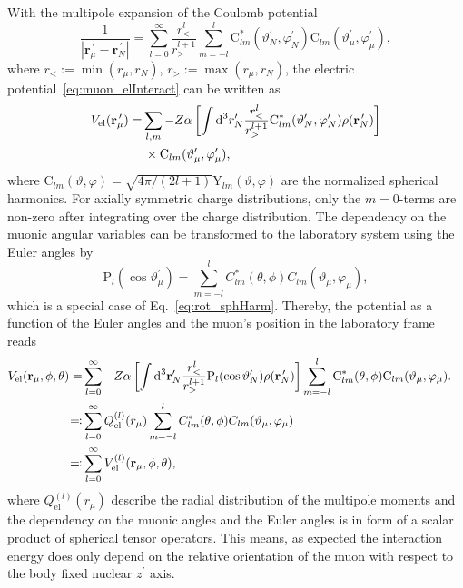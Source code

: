 With the multipole expansion of the Coulomb potential~\cite{jackson1999}
\begin{equation}
\frac{1}{|\mathbf{r}_\mu^{\,\prime}-\mathbf{r}_N^{\,\prime}|}=\sum_{l=0}^\infty \frac{r_<^l}{r_>^{l+1}}\sum_{m=-l}^l  \text{C}^*_{lm}(\vartheta_N^{\prime},\varphi_N^{\prime})\text{C}_{lm}(\vartheta_\mu^\prime,\varphi_\mu^\prime),
\end{equation}
where $r_<:=\min (r_\mu,r_N)$, $r_>:=\max (r_\mu,r_N)$, the electric potential~\eqref{eq:muon_elInteract} can be written as
\begin{align}
V_{\text{el}}(\mathbf{r}_\mu^{\,\prime})=&\sum_{l,m}-Z\alpha \left[ \int \text{d}^3r^{\prime}_N \frac{r_<^l}{r_>^{l+1}}\text{C}^*_{lm}(\vartheta_N^{\prime},\varphi_N^{\prime})\rho(\mathbf{r}_N^{\,\prime})\right]\notag\\
&\,\times\text{C}_{lm}(\vartheta_\mu^{\prime},\varphi_\mu^\prime),
\end{align}
where ${\text{C}_{lm}(\vartheta,\varphi)}{=}{\sqrt{4\pi/(2l+1)}\text{Y}_{lm}(\vartheta,\varphi)}$ are the normalized spherical harmonics.
For axially symmetric charge distributions, only the ${m}{=}{0}$-terms are non-zero after integrating over the charge distribution. The dependency on the muonic angular variables can be transformed to the laboratory system using the Euler angles by
\begin{equation}
\text{P}_{l}(\cos\vartheta_\mu^\prime)=
 \sum_{m=-l}^l C^*_{lm}(\theta,\phi)C_{lm}(\vartheta_\mu,\varphi_\mu),
\end{equation}
which is a special case of Eq.~\eqref{eq:rot_sphHarm}.
Thereby, the potential as a function of the Euler angles and the muon's position in the laboratory frame reads
\begin{align}
V_{\text{el}}(\mathbf{r}_\mu,\phi,\theta)=&\sum_{l=0}^\infty-Z\alpha \left[ \int \text{d}^3\mathbf{r}^{\prime}_N \frac{r_<^l}{r_>^{l+1}}\text{P}_{l}(\cos \vartheta_N^{\prime})\rho(\mathbf{r}_N^{\,\prime})\right]\sum_{m=-l}^l \text{C}^*_{lm}(\theta,\phi)\text{C}_{lm}(\vartheta_\mu,\varphi_\mu).\notag\\
\eqqcolon &\sum_{l=0}^\infty Q_{\text{el}}^{(l)}(r_\mu)\sum_{m=-l}^lC^*_{lm}(\theta,\phi)C_{lm}(\vartheta_\mu,\varphi_\mu)&\notag\\
\eqqcolon& \sum_{l=0}^\infty V^{(l)}_{\text{el}}(\mathbf{r}_\mu,\phi,\theta),
\label{eq:defmulti}
\end{align}
where $Q_{\text{el}}^{(l)}(r_\mu)$ describe the radial distribution of the multipole moments and the dependency on the muonic angles and the Euler angles is in form of a scalar product of spherical tensor operators. This means, as expected the interaction energy does only depend on the relative orientation of the muon with respect to the body fixed nuclear $z^\prime$ axis.

